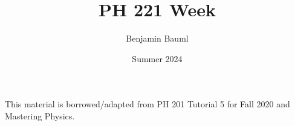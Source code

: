 \documentclass[]{article}
\title{PH 221 Week \Week}
\author{Benjamin Bauml}
\date{Summer 2024}
\newcommand{\FileDepth}{../../..}
\begin{document}
\maketitle
\begin{center}
	This material is borrowed/adapted from PH 201 Tutorial 5 for Fall 2020 and Mastering Physics.
\end{center}





%
\end{document}
